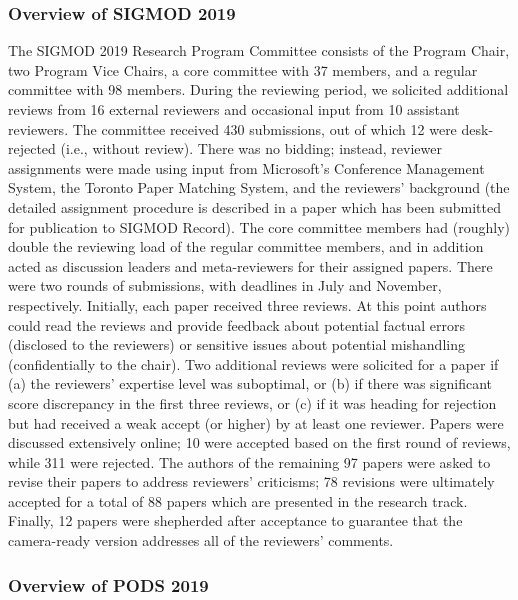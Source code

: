 \subsubsection*{Overview of SIGMOD 2019}

The SIGMOD 2019 Research Program Committee consists of the Program Chair, two Program Vice Chairs, a core committee with 37 members, and a regular committee with 98 members. During the reviewing period, we solicited additional reviews from 16 external reviewers and occasional input from 10 assistant reviewers. The committee received 430 submissions, out of which 12 were desk-rejected (i.e., without review). There was no bidding; instead, reviewer assignments were made using input from Microsoft's Conference Management System, the Toronto Paper Matching System, and the reviewers' background (the detailed assignment procedure is described in a paper which has been submitted for publication to SIGMOD Record). The core committee members had (roughly) double the reviewing load of the regular committee members, and in addition acted as discussion leaders and meta-reviewers for their assigned papers. There were two rounds of submissions, with deadlines in July and November, respectively. Initially, each paper received three reviews. At this point authors could read the reviews and provide feedback about potential factual errors (disclosed to the reviewers) or sensitive issues about potential mishandling (confidentially to the chair). Two additional reviews were solicited for a paper if (a) the reviewers' expertise level was suboptimal, or (b) if there was significant score discrepancy in the first three reviews, or (c) if it was heading for rejection but had received a weak accept (or higher) by at least one reviewer. Papers were discussed extensively online; 10 were accepted based on the first round of reviews, while 311 were rejected. The authors of the remaining 97 papers were asked to revise their papers to address reviewers' criticisms; 78 revisions were ultimately accepted for a total of 88 papers which are presented in the research track. Finally, 12 papers were shepherded after acceptance to guarantee that the camera-ready version addresses all of the reviewers' comments.

\subsubsection*{Overview of PODS 2019}

